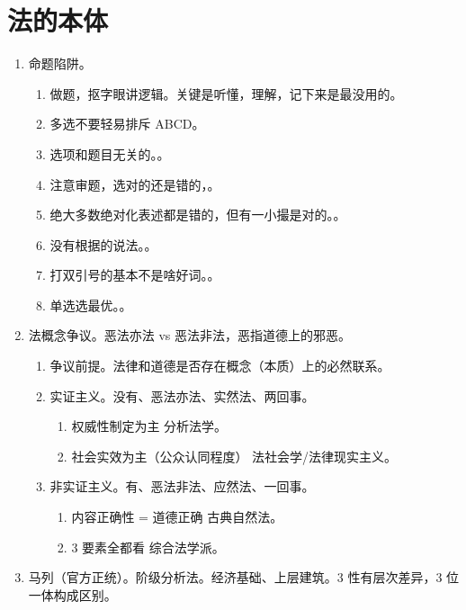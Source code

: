 \section{法的本体}
\begin{enumerate}
  \item 命题陷阱。
        \begin{enumerate}
          \item 做题，抠字眼讲逻辑。关键是听懂，理解，记下来是最没用的。
          \item 多选不要轻易排斥 ABCD。
          \item 选项和题目无关的。。
          \item 注意审题，选对的还是错的，。
          \item 绝大多数绝对化表述都是错的，但有一小撮是对的。。
          \item 没有根据的说法。。
          \item 打双引号的基本不是啥好词。。
          \item 单选选最优。。
        \end{enumerate}
  \item 法概念争议。恶法亦法 vs 恶法非法，恶指道德上的邪恶。
        \begin{enumerate}
          \item 争议前提。法律和道德是否存在概念（本质）上的必然联系。
          \item 实证主义。没有、恶法亦法、实然法、两回事。
                \begin{enumerate}
                  \item 权威性制定为主 \yjt 分析法学。
                  \item 社会实效为主（公众认同程度） \yjt 法社会学/法律现实主义。
                \end{enumerate}
          \item 非实证主义。有、恶法非法、应然法、一回事。
                \begin{enumerate}
                  \item 内容正确性 = 道德正确 \yjt 古典自然法。
                  \item 3 要素全都看 \yjt 综合法学派。
                \end{enumerate}
        \end{enumerate}
  \item 马列（官方正统）。阶级分析法。经济基础、上层建筑。3 性有层次差异，3 位一体构成区别。

\end{enumerate}

